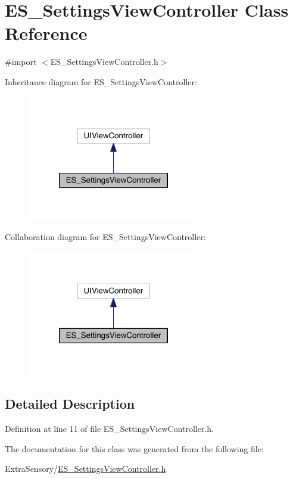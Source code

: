 \hypertarget{interface_e_s___settings_view_controller}{\section{E\+S\+\_\+\+Settings\+View\+Controller Class Reference}
\label{interface_e_s___settings_view_controller}
}


{\ttfamily \#import $<$E\+S\+\_\+\+Settings\+View\+Controller.\+h$>$}



Inheritance diagram for E\+S\+\_\+\+Settings\+View\+Controller\+:\nopagebreak
\begin{figure}[H]
\begin{center}
\leavevmode
\includegraphics[width=214pt]{d9/dae/interface_e_s___settings_view_controller__inherit__graph}
\end{center}
\end{figure}


Collaboration diagram for E\+S\+\_\+\+Settings\+View\+Controller\+:\nopagebreak
\begin{figure}[H]
\begin{center}
\leavevmode
\includegraphics[width=214pt]{d7/db0/interface_e_s___settings_view_controller__coll__graph}
\end{center}
\end{figure}


\subsection{Detailed Description}


Definition at line 11 of file E\+S\+\_\+\+Settings\+View\+Controller.\+h.



The documentation for this class was generated from the following file\+:\begin{DoxyCompactItemize}
\item 
Extra\+Sensory/\hyperlink{_e_s___settings_view_controller_8h}{E\+S\+\_\+\+Settings\+View\+Controller.\+h}\end{DoxyCompactItemize}
